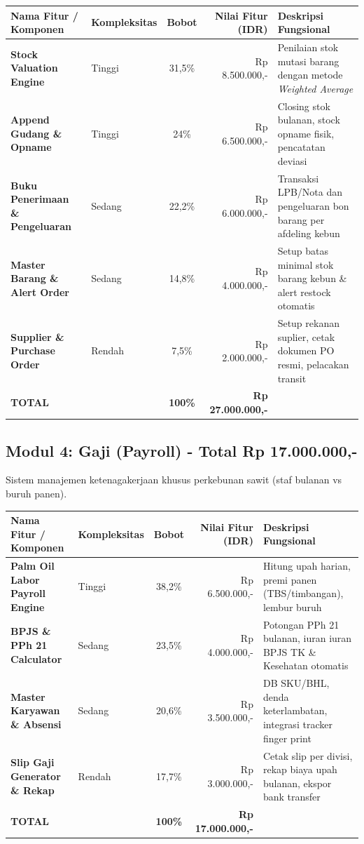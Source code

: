 \documentclass[11pt,a4paper]{article}
\begin{document}
\begin{table}[h!]
\centering
\scriptsize
\begin{tabular}{llcrl}
    \toprule
    \textbf{Nama Fitur / Komponen} & \textbf{Kompleksitas} & \textbf{Bobot} & \textbf{Nilai Fitur (IDR)} & \textbf{Deskripsi Fungsional} \\
    \midrule
    \textbf{Stock Valuation Engine} & Tinggi & 31,5\% & Rp 8.500.000,- & Penilaian stok mutasi barang dengan metode \textit{Weighted Average} \\
    \textbf{Append Gudang \& Opname} & Tinggi & 24\% & Rp 6.500.000,- & Closing stok bulanan, stock opname fisik, pencatatan deviasi \\
    \textbf{Buku Penerimaan \& Pengeluaran} & Sedang & 22,2\% & Rp 6.000.000,- & Transaksi LPB/Nota dan pengeluaran bon barang per afdeling kebun \\
    \textbf{Master Barang \& Alert Order} & Sedang & 14,8\% & Rp 4.000.000,- & Setup batas minimal stok barang kebun \& alert restock otomatis \\
    \textbf{Supplier \& Purchase Order} & Rendah & 7,5\% & Rp 2.000.000,- & Setup rekanan suplier, cetak dokumen PO resmi, pelacakan transit \\
    \midrule
    \textbf{TOTAL} & & \textbf{100\%} & \textbf{Rp 27.000.000,-} & \\
    \bottomrule
\end{tabular}
\end{table}

\newpage

\subsection{Modul 4: Gaji (Payroll) - Total Rp 17.000.000,-}
Sistem manajemen ketenagakerjaan khusus perkebunan sawit (staf bulanan vs buruh panen).

\begin{table}[h!]
\centering
\scriptsize
\begin{tabular}{llcrl}
    \toprule
    \textbf{Nama Fitur / Komponen} & \textbf{Kompleksitas} & \textbf{Bobot} & \textbf{Nilai Fitur (IDR)} & \textbf{Deskripsi Fungsional} \\
    \midrule
    \textbf{Palm Oil Labor Payroll Engine} & Tinggi & 38,2\% & Rp 6.500.000,- & Hitung upah harian, premi panen (TBS/timbangan), lembur buruh \\
    \textbf{BPJS \& PPh 21 Calculator} & Sedang & 23,5\% & Rp 4.000.000,- & Potongan PPh 21 bulanan, iuran iuran BPJS TK \& Kesehatan otomatis \\
    \textbf{Master Karyawan \& Absensi} & Sedang & 20,6\% & Rp 3.500.000,- & DB SKU/BHL, denda keterlambatan, integrasi tracker finger print \\
    \textbf{Slip Gaji Generator \& Rekap} & Rendah & 17,7\% & Rp 3.000.000,- & Cetak slip per divisi, rekap biaya upah bulanan, ekspor bank transfer \\
    \midrule
    \textbf{TOTAL} & & \textbf{100\%} & \textbf{Rp 17.000.000,-} & \\
    \bottomrule
\end{tabular}
\end{table}
\end{document}
